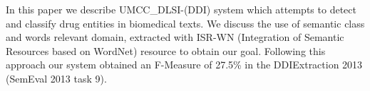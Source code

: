 In this paper we describe UMCC\_DLSI-(DDI) system which attempts to detect and classify drug entities in biomedical texts. We discuss the use of semantic
 class and words relevant domain, extracted with ISR-WN (Integration of Semantic
 Resources based on WordNet) resource to obtain our goal. Following this
 approach our system obtained an F-Measure of 27.5\% in the DDIExtraction 2013
 (SemEval 2013 task 9).

